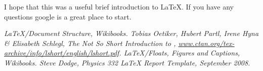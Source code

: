 \documentclass[11pt,letterpaper]{article} %
\begin{document}
I hope that this was a useful brief introduction to \LaTeX. If you have any questions google is a great place to start.





\begin{thebibliography}{99} %

 \itshape LaTeX/Document Structure\normalfont, Wikibooks.
 Tobias Oetiker, Hubert Partl, Irene Hyna \& Elisabeth Schlegl, \itshape The Not So Short Introduction to \LaTeXe \normalfont, \url{www.ctan.org/tex-archive/info/lshort/english/lshort.pdf}.
 \itshape LaTeX/Floats, Figures and Captions\normalfont, Wikibooks.
 Steve Dodge, \itshape Physics 332 \LaTeX{} Report Template\normalfont, September 2008.


\end{thebibliography}
\end{document}
